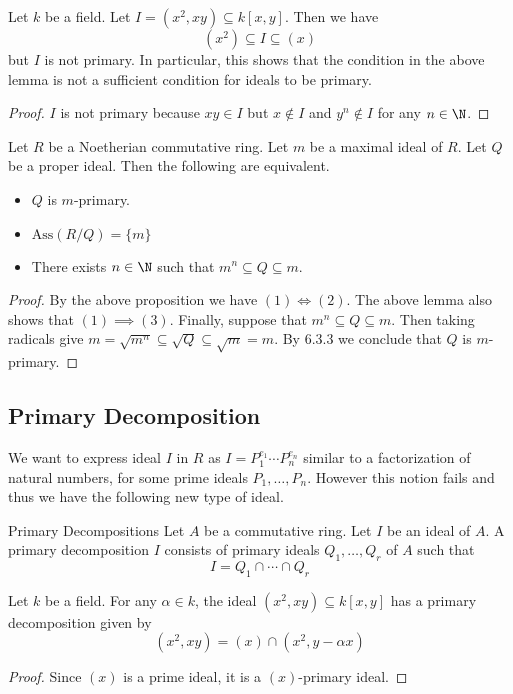 \documentclass[a4paper]{article}
\begin{document}
\begin{eg}{}{} Let $k$ be a field. Let $I=(x^2,xy)\subseteq k[x,y]$. Then we have $$(x^2)\subseteq I\subseteq(x)$$ but $I$ is not primary. In particular, this shows that the condition in the above lemma is not a sufficient condition for ideals to be primary. \tcbline
\begin{proof}
$I$ is not primary because $xy\in I$ but $x\notin I$ and $y^n\notin I$ for any $n\in\N$. 
\end{proof}
\end{eg}

\begin{crl}{}{} Let $R$ be a Noetherian commutative ring. Let $m$ be a maximal ideal of $R$. Let $Q$ be a proper ideal. Then the following are equivalent. 
\begin{itemize}
\item $Q$ is $m$-primary. 
\item $\text{Ass}(R/Q)=\{m\}$
\item There exists $n\in\N$ such that $m^n\subseteq Q\subseteq m$. 
\end{itemize} \tcbline
\begin{proof}
By the above proposition we have $(1)\iff(2)$. The above lemma also shows that $(1)\implies(3)$. Finally, suppose that $m^n\subseteq Q\subseteq m$. Then taking radicals give $m=\sqrt{m^n}\subseteq\sqrt{Q}\subseteq\sqrt{m}=m$. By 6.3.3 we conclude that $Q$ is $m$-primary. 
\end{proof}
\end{crl}

\subsection{Primary Decomposition}
We want to express ideal $I$ in $R$ as $I=P_1^{e_1}\cdots P_n^{e_n}$ similar to a factorization of natural numbers, for some prime ideals $P_1,\dots,P_n$. However this notion fails and thus we have the following new type of ideal. 

\begin{defn}{Primary Decompositions}{} Let $A$ be a commutative ring. Let $I$ be an ideal of $A$. A primary decomposition $I$ consists of primary ideals $Q_1,\dots,Q_r$ of $A$ such that $$I=Q_1\cap\cdots\cap Q_r$$
\end{defn}

\begin{eg}{}{} Let $k$ be a field. For any $\alpha\in k$, the ideal $(x^2,xy)\subseteq k[x,y]$ has a primary decomposition given by $$(x^2,xy)=(x)\cap(x^2,y-\alpha x)$$ \tcbline
\begin{proof}
Since $(x)$ is a prime ideal, it is a $(x)$-primary ideal. 
\end{proof}
\end{eg}
\end{document}
